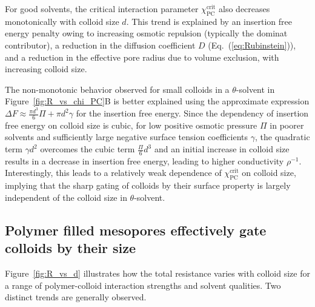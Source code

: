 \documentclass[12pt, a4paper]{article}
\begin{document}
For good solvents, the critical interaction parameter $\chi_{\text{PC}}^{\text{crit}}$ also decreases monotonically with colloid size $d$. 
This trend is explained by an insertion free energy penalty owing to increasing osmotic repulsion (typically the dominat contributor), a reduction in the diffusion coefficient $D$ (Eq.~(\ref{eq:Rubinstein})), and a reduction in the effective pore radius due to volume exclusion, with increasing colloid size.


The non-monotonic behavior observed for small colloids in a $\theta$-solvent in Figure~\ref{fig:R_vs_chi_PC}B is better explained using the approximate expression $\Delta F \approx \frac{\pi d^3}{6} \Pi + \pi d^2 \gamma$ for the insertion free energy.
Since the dependency of insertion free energy on colloid size is cubic, for low positive osmotic pressure $\Pi$ in poorer solvents and sufficiently large negative surface tension coefficients $\gamma$, the quadratic term $\gamma d^2$ overcomes the cubic term $\frac{\Pi}{6} d^3$ and an initial increase in colloid size results in a decrease in insertion free energy, leading to higher conductivity $\rho^{-1}$. 
Interestingly, this leads to a relatively weak dependence of $\chi_{\text{PC}}^{\text{crit}}$ on colloid size, implying that the sharp gating of colloids by their surface property is largely independent of the colloid size in $\theta$-solvent.


\subsection{Polymer filled mesopores effectively gate colloids by their size}

Figure~\ref{fig:R_vs_d} illustrates how the total resistance varies with colloid size for a range of polymer-colloid interaction strengths and solvent qualities. 
Two distinct trends are generally observed.
\end{document}
